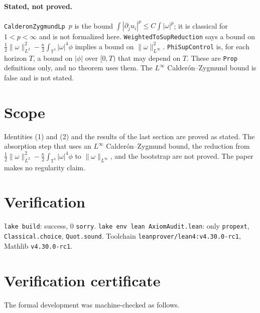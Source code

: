 \documentclass[11pt]{article}
\begin{document}
\paragraph{Stated, not proved.} \texttt{CalderonZygmundLp}~$p$ is the bound
$\int|\partial_ju_i|^p\le C\int|\omega|^p$; it is classical for $1<p<\infty$ and is not formalized here.
\texttt{WeightedToSupReduction} says a bound on $\frac12\|\omega\|_{L^2}^2-\frac{\kappa}{2}\int_{\mathbb{T}^3}|\omega|^4\phi$ implies a bound on $\|\omega\|_{L^\infty}^2$.
\texttt{PhiSupControl} is, for each horizon $T$, a bound on $|\phi|$ over $[0,T)$ that may depend on $T$. These are \texttt{Prop} definitions only, and
no theorem uses them. The $L^\infty$ Calder\'on--Zygmund bound is false and is not stated.

\section{Scope}
Identities (1) and (2) and the results of the last section are proved as stated. The absorption
step that uses an $L^\infty$ Calder\'on--Zygmund bound, the reduction from $\frac12\|\omega\|_{L^2}^2-\frac{\kappa}{2}\int_{\mathbb{T}^3}|\omega|^4\phi$ to $\|\omega\|_{L^\infty}$, and the
bootstrap are not proved. The paper makes no regularity claim.

\section*{Verification}
\texttt{lake build}: success, 0 \texttt{sorry}. \texttt{lake env lean AxiomAudit.lean}: only
\texttt{propext}, \texttt{Classical.choice}, \texttt{Quot.sound}. Toolchain
\texttt{leanprover/lean4:v4.30.0-rc1}, Mathlib \texttt{v4.30.0-rc1}.
\appendix
\section{Verification certificate}\label{app:verification-certificate}

The formal development was machine-checked as follows.
\end{document}
